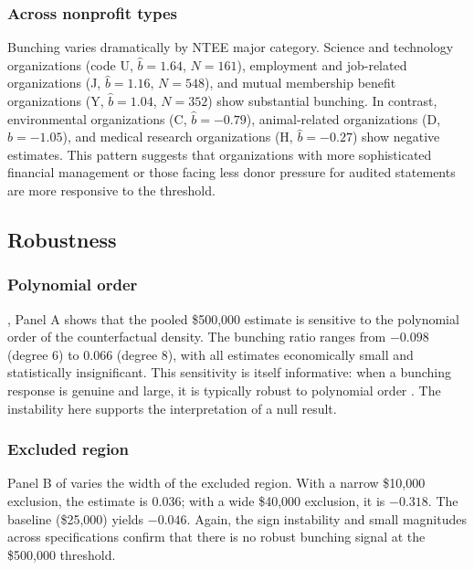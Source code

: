 \documentclass[12pt]{article}
\begin{document}
\subsubsection*{Across nonprofit types} Bunching varies dramatically by NTEE major category. Science and technology organizations (code U, $\hat{b} = 1.64$, $N = 161$), employment and job-related organizations (J, $\hat{b} = 1.16$, $N = 548$), and mutual membership benefit organizations (Y, $\hat{b} = 1.04$, $N = 352$) show substantial bunching. In contrast, environmental organizations (C, $\hat{b} = -0.79$), animal-related organizations (D, $\hat{b} = -1.05$), and medical research organizations (H, $\hat{b} = -0.27$) show negative estimates. This pattern suggests that organizations with more sophisticated financial management or those facing less donor pressure for audited statements are more responsive to the threshold.

\subsection{Robustness}



\subsubsection*{Polynomial order} , Panel A shows that the pooled \$500,000 estimate is sensitive to the polynomial order of the counterfactual density. The bunching ratio ranges from $-0.098$ (degree 6) to $0.066$ (degree 8), with all estimates economically small and statistically insignificant. This sensitivity is itself informative: when a bunching response is genuine and large, it is typically robust to polynomial order \citep{Kleven2013}. The instability here supports the interpretation of a null result.

\subsubsection*{Excluded region} Panel B of  varies the width of the excluded region. With a narrow \$10,000 exclusion, the estimate is $0.036$; with a wide \$40,000 exclusion, it is $-0.318$. The baseline (\$25,000) yields $-0.046$. Again, the sign instability and small magnitudes across specifications confirm that there is no robust bunching signal at the \$500,000 threshold.


\end{document}
